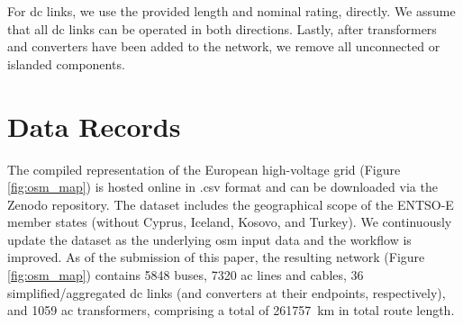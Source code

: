 \documentclass[fleqn,10pt]{wlscirep}
\let\autocite\cite
\begin{document}
For \acrshort{dc} links, we use the provided length and nominal rating, directly. We assume that all \acrshort{dc} links can be operated in both directions. Lastly, after transformers and converters have been added to the network, we remove all unconnected or islanded components. 


\section*{Data Records}
The compiled representation of the European high-voltage grid (Figure \ref{fig:osm_map}) is hosted online in .csv format and can be downloaded via the Zenodo repository.\autocite{xiongPrebuiltElectricityNetwork2024} The dataset includes the geographical scope of the ENTSO-E member states (without Cyprus, Iceland, Kosovo, and Turkey). 
We continuously update the dataset as the underlying \gls{osm} input data and the workflow is improved. As of the submission of this paper, the resulting network (Figure \ref{fig:osm_map}) contains 5848 buses, 7320 \acrshort{ac} lines and cables, 36 simplified/aggregated \acrshort{dc} links (and converters at their endpoints, respectively), and 1059 \acrshort{ac} transformers, comprising a total of \SI{261757}{\kilo\meter} in total route length.
\end{document}
